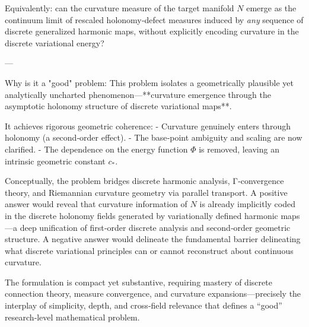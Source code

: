 Equivalently: can the curvature measure of the target manifold \(N\) emerge as the continuum limit of rescaled holonomy‑defect measures induced by \emph{any} sequence of discrete generalized harmonic maps, without explicitly encoding curvature in the discrete variational energy?

---

Why is it a "good" problem:  
This problem isolates a geometrically plausible yet analytically uncharted phenomenon—**curvature emergence through the asymptotic holonomy structure of discrete variational maps**.  

It achieves rigorous geometric coherence:
- Curvature genuinely enters through holonomy (a second‑order effect).
- The base‑point ambiguity and scaling are now clarified.
- The dependence on the energy function \(\Phi\) is removed, leaving an intrinsic geometric constant \(c_*\).

Conceptually, the problem bridges discrete harmonic analysis, Γ‑convergence theory, and Riemannian curvature geometry via parallel transport.  
A positive answer would reveal that curvature information of \(N\) is already implicitly coded in the discrete holonomy fields generated by variationally defined harmonic maps—a deep unification of first‑order discrete analysis and second‑order geometric structure.  
A negative answer would delineate the fundamental barrier delineating what discrete variational principles can or cannot reconstruct about continuous curvature.

The formulation is compact yet substantive, requiring mastery of discrete connection theory, measure convergence, and curvature expansions—precisely the interplay of simplicity, depth, and cross‑field relevance that defines a “good” research‑level mathematical problem.